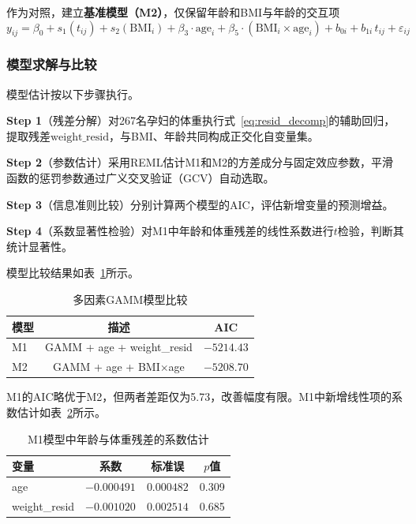 作为对照，建立\textbf{基准模型（M2）}，仅保留年龄和BMI与年龄的交互项
\begin{equation}\label{eq:gamm_q3_m2}
  y_{ij} = \beta_0 + s_1(t_{ij}) + s_2(\mathrm{BMI}_i) + \beta_3 \cdot \text{age}_i + \beta_5 \cdot (\mathrm{BMI}_i \times \text{age}_i) + b_{0i} + b_{1i}\,t_{ij} + \varepsilon_{ij}
\end{equation}

\subsubsection{模型求解与比较}

模型估计按以下步骤执行。

\textbf{Step 1}（残差分解）\quad 对267名孕妇的体重执行式~\eqref{eq:resid_decomp}的辅助回归，提取残差$\text{weight\_resid}$，与BMI、年龄共同构成正交化自变量集。

\textbf{Step 2}（参数估计）\quad 采用REML估计M1和M2的方差成分与固定效应参数，平滑函数的惩罚参数通过广义交叉验证（GCV）自动选取。

\textbf{Step 3}（信息准则比较）\quad 分别计算两个模型的AIC，评估新增变量的预测增益。

\textbf{Step 4}（系数显著性检验）\quad 对M1中年龄和体重残差的线性系数进行$t$检验，判断其统计显著性。

模型比较结果如表~\ref{tab:q3_model_compare}所示。

\begin{table}[H]
  \caption{多因素GAMM模型比较}
  \label{tab:q3_model_compare}
  \centering
  \begin{tabular}{lcc}
    \hline
    模型 & 描述 & AIC \\
    \hline
    M1 & GAMM + age + weight\_resid & $-5214.43$ \\
    M2 & GAMM + age + BMI$\times$age & $-5208.70$ \\
    \hline
  \end{tabular}
\end{table}

M1的AIC略优于M2，但两者差距仅为5.73，改善幅度有限。M1中新增线性项的系数估计如表~\ref{tab:q3_coef}所示。

\begin{table}[H]
  \caption{M1模型中年龄与体重残差的系数估计}
  \label{tab:q3_coef}
  \centering
  \begin{tabular}{lccc}
    \hline
    变量 & 系数 & 标准误 & $p$值 \\
    \hline
    age & $-0.000491$ & $0.000482$ & 0.309 \\
    weight\_resid & $-0.001020$ & $0.002514$ & 0.685 \\
    \hline
  \end{tabular}
\end{table}

